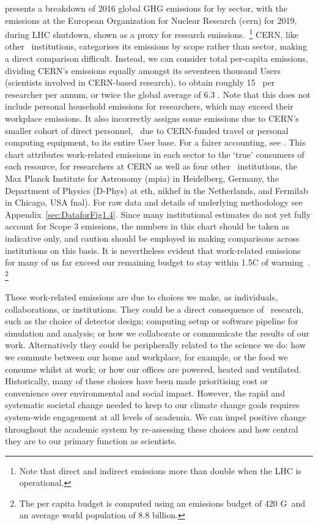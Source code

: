 \documentclass[../SustainableHEP.tex]{subfiles}
\begin{document}
 presents a breakdown of 2016 global GHG emissions for by sector, with the emissions at the European Organization for Nuclear Research (\acrshort{cern}) for 2019, during LHC shutdown, shown as a proxy for research emissions.~\footnote{Note that direct and indirect emissions more than double when the LHC is operational.}  CERN, like other \ACR\ institutions, categorises its emissions by scope rather than sector, making a direct comparison difficult.  Instead, we can consider total
per-capita emissions, dividing CERN's emissions equally amongst its seventeen thousand Users (scientists involved in CERN-based research), to obtain roughly 15 \tCdOe\ per researcher per annum, or twice the global average of 6.3 \tCdOe.  Note that this does not include personal household emissions for researchers, which may exceed their workplace emissions.  It also incorrectly assigns some emissions due to CERN's smaller cohort of direct personnel, \eg\ due to CERN-funded travel or personal computing equipment, to its entire User base.  For a fairer accounting, see .  This chart attributes work-related emissions in each sector to the `true' consumers of each resource, for researchers at CERN as well as four other \ACR\ institutions, the Max Planck Institute for Astronomy (\acrshort{mpia}) in Heidelberg, Germany, the Department of Physics (D-Phys) at \acrshort{eth}, \acrshort{nikhef} in the Netherlands, and Fermilab in Chicago, USA \acrshort{fnal}).  For raw data and details of underlying methodology see Appendix~\ref{sec:DataforFig1.4}.  Since many institutional estimates do not yet fully account for Scope 3 emissions, the numbers in this chart should be taken as indicative only, and caution should be employed in making comparisons across institutions on this basis.  It is nevertheless evident that work-related emissions for many of us far exceed our remaining budget to stay within 
1.5\degree C of warming~\cite{IPCC2021reportSPM}. \footnote{The per capita budget is computed using an emissions budget of 420 G\tCdOe\, and an average world population of 8.8 billion.} 

These work-related emissions are due to choices we make, as individuals, collaborations, or institutions.  They could be a direct consequence of \ACR\ research, such as the choice of detector design; computing setup or software pipeline for simulation and analysis; or how we collaborate or communicate the results of our work.  Alternatively they could be peripherally related to the science we do: how we commute between our home and workplace, for example, or the food we consume whilst at work; or how our offices are powered, heated and ventilated. 
Historically, many of these choices have been made prioritising cost or convenience over environmental and social impact.  However, the rapid and systematic societal change needed to keep to our climate change goals requires system-wide engagement at all levels of academia.  We can impel positive change throughout the academic system by re-assessing these choices and how central they are to our primary function as scientists.
\end{document}

